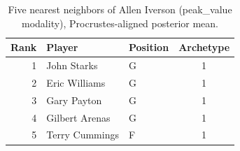 \begin{table}[htbp]
  \centering\small
  \begin{tabular}{rllc}
    \toprule
    Rank & Player & Position & Archetype \\
    \midrule
    1 & John Starks & G & 1 \\
    2 & Eric Williams & G & 1 \\
    3 & Gary Payton & G & 1 \\
    4 & Gilbert Arenas & G & 1 \\
    5 & Terry Cummings & F & 1 \\
    \bottomrule
  \end{tabular}
  \caption{Five nearest neighbors of Allen Iverson (peak_value modality), Procrustes-aligned posterior mean.}
  \label{tab:Allen_Iverson_neighbors_peak_value}
\end{table}

